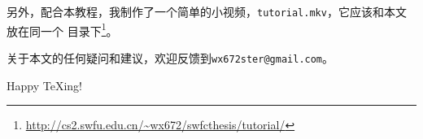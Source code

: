 另外，配合本教程，我制作了一个简单的小视频，\texttt{tutorial.mkv}，它应该和本文放在同一个
目录下\footnote{\url{http://cs2.swfu.edu.cn/~wx672/swfcthesis/tutorial/}}。

关于本文的任何疑问和建议，欢迎反馈到\texttt{wx672ster@gmail.com}。

\begin{flushright}
  {\Huge {}Happy \TeX{}ing!}
\end{flushright}

